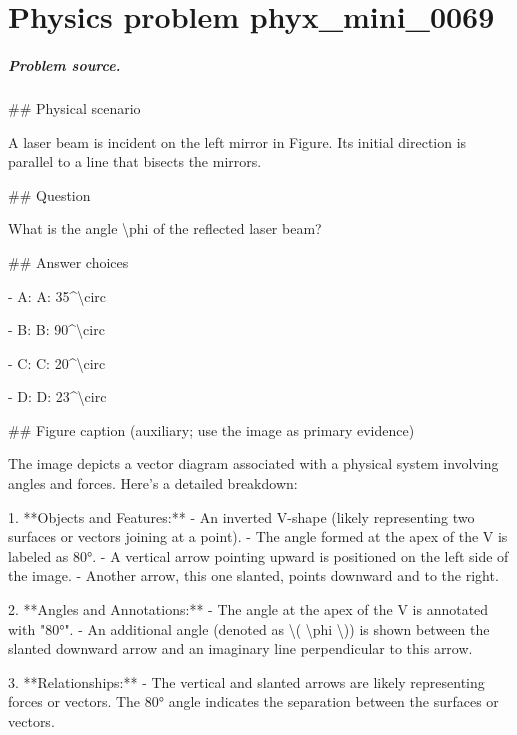 
\chapter{Physics problem phyx\_mini\_0069}
\label{ch:PhyXMiniProblems_problem_phyx_mini_0069}

\paragraph{Problem source.}
\#\# Physical scenario

A laser beam is incident on the left mirror in Figure. Its initial direction is parallel to a line that bisects the mirrors.

\#\# Question

What is the angle \textbackslash{}phi of the reflected laser beam?

\#\# Answer choices

- A: A: 35\textasciicircum{}\textbackslash{}circ

- B: B: 90\textasciicircum{}\textbackslash{}circ

- C: C: 20\textasciicircum{}\textbackslash{}circ

- D: D: 23\textasciicircum{}\textbackslash{}circ

\#\# Figure caption (auxiliary; use the image as primary evidence)

The image depicts a vector diagram associated with a physical system involving angles and forces. Here's a detailed breakdown:

1. **Objects and Features:**
   - An inverted V-shape (likely representing two surfaces or vectors joining at a point).
   - The angle formed at the apex of the V is labeled as 80°.
   - A vertical arrow pointing upward is positioned on the left side of the image.
   - Another arrow, this one slanted, points downward and to the right.

2. **Angles and Annotations:**
   - The angle at the apex of the V is annotated with "80°".
   - An additional angle (denoted as \textbackslash{}( \textbackslash{}phi \textbackslash{})) is shown between the slanted downward arrow and an imaginary line perpendicular to this arrow.

3. **Relationships:**
   - The vertical and slanted arrows are likely representing forces or vectors. The 80° angle indicates the separation between the surfaces or vectors.

